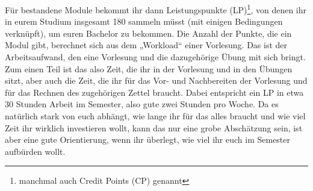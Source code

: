 Für bestandene Module bekommt ihr dann Leistungspunkte (LP)\footnote{manchmal
auch Credit Points (CP) genannt}, von denen ihr in eurem Studium insgesamt 180
sammeln müsst (mit einigen Bedingungen verknüpft), um euren Bachelor zu
bekommen. Die Anzahl der Punkte, die ein Modul gibt, berechnet sich aus dem
„Workload“ einer Vorlesung. Das ist der Arbeitsaufwand, den eine Vorlesung und
die dazugehörige Übung mit sich bringt. Zum einen Teil ist das also Zeit, die
ihr in der Vorlesung und in den Übungen sitzt, aber auch die Zeit, die ihr für
das Vor- und Nachbereiten der Vorlesung und für das Rechnen des zugehörigen
Zettel braucht. Dabei entspricht ein LP in etwa 30 Stunden Arbeit im Semester,
also gute zwei Stunden pro Woche. Da es natürlich stark von euch abhängt, wie
lange ihr für das alles braucht und wie viel Zeit ihr wirklich investieren
wollt, kann das nur eine grobe Abschätzung sein, ist aber eine gute
Orientierung, wenn ihr überlegt, wie viel ihr euch im Semester aufbürden wollt.
